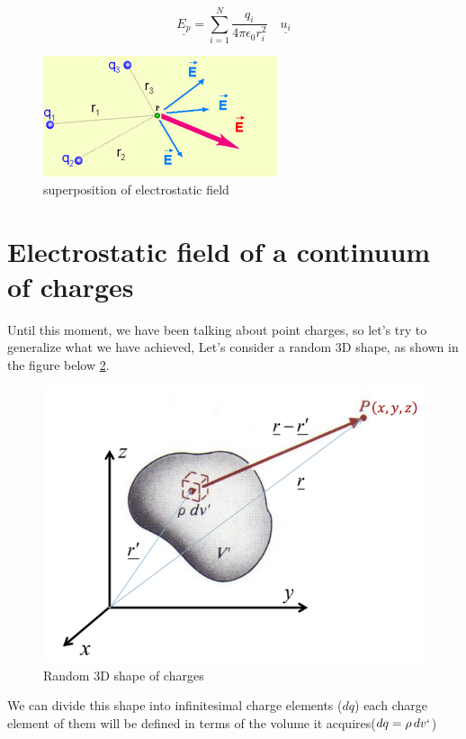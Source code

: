 \documentclass[12 pt]{article}
\begin{document}
\begin{minipage}{0.35\linewidth}
$$
\underline{E_p}=\sum_{i=1}^{N}\frac{q_i}{4\pi \epsilon_{0} r_i^2}\quad \underline{u_i}
$$
\end{minipage}
\begin{minipage}{0.6\linewidth}
    \begin{figure}[H]
        \centering
        \includegraphics[scale=0.7]{./images/superposition1}
        \caption{superposition of electrostatic field}
        \label{super1} 
    \end{figure}
\end{minipage}
\newpage
\section{Electrostatic field of a continuum of charges}
Until this moment, we have been talking about point charges, so let's try to generalize what we have achieved, Let's consider a random 3D shape, as shown in the figure below \ref{cont1}. 
    \begin{figure}[H]
        \centering
        \includegraphics[scale=0.45]{./images/cont1}
        \caption{Random 3D shape of charges}
        \label{cont1} 
    \end{figure}
We can divide this shape into infinitesimal charge elements ($dq$) each charge element of them will be defined in terms of the volume it acquires($dq=\rho \, dv`$)
\end{document}
